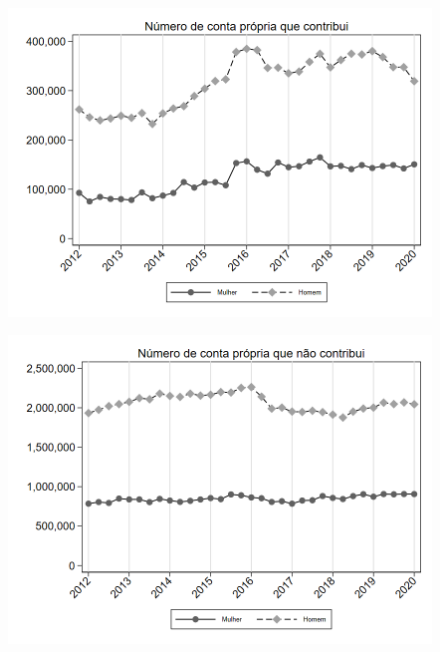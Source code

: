 \begin{frame}[label=_composicao_demografica_genero_n_cpropriaC]{}
\textit{\hyperlink{_composicao_demografica_genero}{}}
\begin{figure}
  \centering
  \includegraphics[width=1.0\linewidth]{../../analysis/output/composicao_demografica/genero/_composicao_demografica_genero_n_cpropriaC.png}
  \caption{}
  \label{fig:_composicao_demografica_genero_n_cpropriaC}
\end{figure}
\end{frame}

\begin{frame}[label=_composicao_demografica_genero_n_cpropriaNc]{}
\textit{\hyperlink{_composicao_demografica_genero}{}}
\begin{figure}
  \centering
  \includegraphics[width=1.0\linewidth]{../../analysis/output/composicao_demografica/genero/_composicao_demografica_genero_n_cpropriaNc.png}
  \caption{}
  \label{fig:_composicao_demografica_genero_n_cpropriaNc}
\end{figure}
\end{frame}